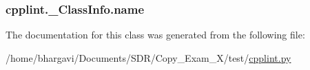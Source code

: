 \subsubsection[{\texorpdfstring{name}{name}}]{\setlength{\rightskip}{0pt plus 5cm}cpplint.\+\_\+\+Class\+Info.\+name}\hypertarget{classcpplint_1_1___class_info_a3de5f207d3449d735d15ebca779fe336}{}\label{classcpplint_1_1___class_info_a3de5f207d3449d735d15ebca779fe336}


The documentation for this class was generated from the following file\+:\begin{DoxyCompactItemize}
\item 
/home/bhargavi/\+Documents/\+S\+D\+R/\+Copy\+\_\+\+Exam\+\_\+X/test/\hyperlink{cpplint_8py}{cpplint.\+py}\end{DoxyCompactItemize}
